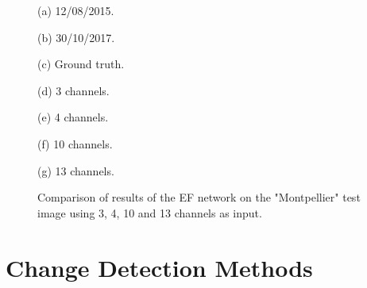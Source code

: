 \documentclass{article}
\begin{document}
\begin{figure*}[ht]

  \begin{minipage}[b]{0.13\linewidth}
    \centering
    \centerline{}
    \centerline{(a) 12/08/2015.}\medskip
  \end{minipage}
  \hfill
  \begin{minipage}[b]{0.13\linewidth}
    \centering
    \centerline{}
    \centerline{(b) 30/10/2017.}\medskip
  \end{minipage}
  \hfill
  \begin{minipage}[b]{0.13\linewidth}
    \centering
    \centerline{}
    \centerline{(c) Ground truth.}\medskip
  \end{minipage}
  \hfill
  \begin{minipage}[b]{0.13\linewidth}
    \centering
    \centerline{}
    \centerline{(d) 3 channels.}\medskip
  \end{minipage}
  \hfill
  \begin{minipage}[b]{0.13\linewidth}
    \centering
    \centerline{}
    \centerline{(e) 4 channels.}\medskip
  \end{minipage}
  \hfill
  \begin{minipage}[b]{0.13\linewidth}
    \centering
    \centerline{}
    \centerline{(f) 10 channels.}\medskip
  \end{minipage}
  \hfill
  \begin{minipage}[b]{0.13\linewidth}
    \centering
    \centerline{}
    \centerline{(g) 13 channels.}\medskip
  \end{minipage}
  
  \caption{Comparison of results of the EF network on the "Montpellier" test image using 3, 4, 10 and 13 channels as input.}
  \label{fig:ch_comp}
\end{figure*}

\section{Change Detection Methods}
\label{sec:cd}
\end{document}
